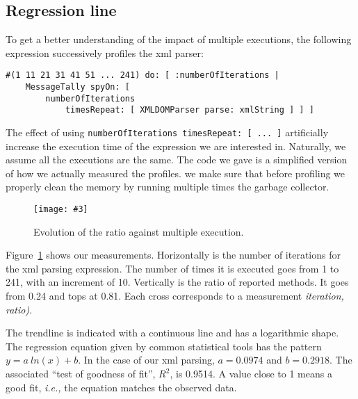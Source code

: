 \documentclass{sig-alternate}
\newcommand{\ct}{\lstinline[backgroundcolor=\color{white},basicstyle=\footnotesize\ttfamily]}
\newcommand{\fig}[4]{
	\begin{figure}[#1]
		\centering
		\texttt{[image: \#3]}
		\caption{\label{fig:#3}#4}
	\end{figure}}
\newcommand{\ie}{\emph{i.e.,}\xspace}
\newcommand{\figref}[1]{Figure~\ref{fig:#1}}
\begin{document}
\subsection{Regression line}

To get a better understanding of the impact of multiple executions, the following expression successively profiles the xml parser:

\begin{lstlisting}
#(1 11 21 31 41 51 ... 241) do: [ :numberOfIterations |
	MessageTally spyOn: [  
		numberOfIterations 
			timesRepeat: [ XMLDOMParser parse: xmlString ] ] ]
\end{lstlisting}

The effect of using \ct{numberOfIterations timesRepeat: [ ... ]} artificially increase the execution time of the expression we are interested in. Naturally, we assume all the executions are the same. The code we gave is a simplified version of how we actually measured the profiles. we make sure that before profiling we properly clean the memory by running multiple times the garbage collector.

%

\fig{h}{0.5}{IterationEvolution}{Evolution of the ratio against multiple execution.}

\figref{IterationEvolution} shows our measurements. Horizontally is the number of iterations for the xml parsing expression. The number of times it is executed goes from 1 to 241, with an increment of 10. Vertically is the ratio of reported methods. It goes from 0.24 and tops at 0.81. Each cross corresponds to a measurement \textit{iteration, ratio)}.

The trendline is indicated with a continuous line and has a logarithmic shape. The regression equation given by common statistical tools has the pattern $y = a~ln(x) + b$. In the case of our xml parsing, $a = 0.0974$ and $b = 0.2918$. The associated ``test of goodness of fit'', $R^2$, is 0.9514. A value close to 1 means a good fit, \ie the equation matches the observed data.
\end{document}
